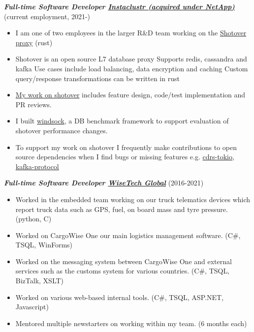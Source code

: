 \documentclass[line, resMargin, a4paper]{res}
\begin{document}
\begin{resume}
    \textbf{\emph {Full-time Software Developer \href{https://www.instaclustr.com}{Instaclustr (acquired under NetApp) }}} (current employment, 2021-)
    \begin{itemize}
        \item I am one of two employees in the larger R\&D team working on the \href{https://github.com/shotover/shotover-proxy}{Shotover proxy} (rust)
        \item Shotover is an open source L7 database proxy
            \subitem Supports redis, cassandra and kafka
            \subitem Use cases include load balancing, data encryption and caching
            \subitem Custom query/response transformations can be written in rust
        \item \href{https://github.com/shotover/shotover-proxy/pulls?q=author%3Arukai}{My work on shotover} includes feature design, code/test implementation and PR reviews.
        \item I built \href{https://github.com/shotover/windsock}{windsock}, a DB benchmark framework to support evaluation of shotover performance changes.
        \item To support my work on shotover I frequently make contributions to open source dependencies when I find bugs or missing features e.g. \href{https://github.com/krojew/cdrs-tokio/pulls?q=author%3Arukai}{cdrs-tokio}, \href{https://github.com/tychedelia/kafka-protocol-rs/pulls?q=is%3Apr+is%3Aclosed+author%3Arukai}{kafka-protocol}
    \end{itemize}

    \textbf{\emph {Full-time Software Developer \href{http://www.wisetechglobal.com}{WiseTech Global}}} (2016-2021)
    \begin{itemize}
        \item Worked in the embedded team working on our truck telematics devices which report truck data such as GPS, fuel, on board mass and tyre pressure. (python, C)
        \item Worked on CargoWise One our main logistics management software. (C\#, TSQL, WinForms)
        \item Worked on the messaging system between CargoWise One and external services such as the customs system for various countries. (C\#, TSQL, BizTalk, XSLT)
        \item Worked on various web-based internal tools. (C\#, TSQL, ASP.NET, Javascript)
        \item Mentored multiple newstarters on working within my team. (6 months each)
    \end{itemize}


\end{resume}
\end{document}
